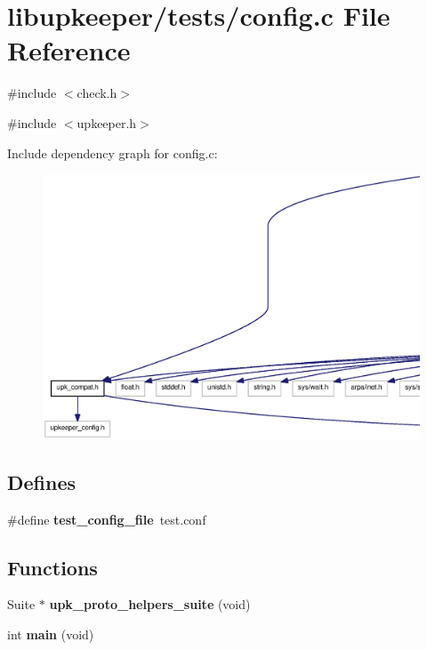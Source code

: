 \section{libupkeeper/tests/config.c File Reference}
\label{libupkeeper_2tests_2config_8c}
{\ttfamily \#include $<$check.h$>$}\par
{\ttfamily \#include $<$upkeeper.h$>$}\par
Include dependency graph for config.c:
\nopagebreak
\begin{figure}[H]
\begin{center}
\leavevmode
\includegraphics[width=400pt]{libupkeeper_2tests_2config_8c__incl}
\end{center}
\end{figure}
\subsection*{Defines}
\begin{DoxyCompactItemize}
\item 
\#define {\bf test\_\-config\_\-file}~test.conf
\end{DoxyCompactItemize}
\subsection*{Functions}
\begin{DoxyCompactItemize}
\item 
Suite $\ast$ {\bf upk\_\-proto\_\-helpers\_\-suite} (void)
\item 
int {\bf main} (void)
\end{DoxyCompactItemize}


